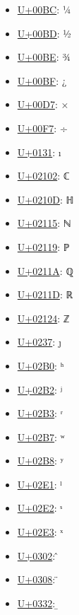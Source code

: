 \begin{itemize}
	\item \href{https://decodeunicode.org/en/u+00BC}{U+00BC}: ¼
	\item \href{https://decodeunicode.org/en/u+00BD}{U+00BD}: ½
	\item \href{https://decodeunicode.org/en/u+00BE}{U+00BE}: ¾
	\item \href{https://decodeunicode.org/en/u+00BF}{U+00BF}: ¿
	\item \href{https://decodeunicode.org/en/u+00D7}{U+00D7}: ×
	\item \href{https://decodeunicode.org/en/u+00F7}{U+00F7}: ÷
	\item \href{https://decodeunicode.org/en/u+0131}{U+0131}: ı
	\item \href{https://decodeunicode.org/en/u+02102}{U+02102}: ℂ
	\item \href{https://decodeunicode.org/en/u+0210D}{U+0210D}: ℍ
	\item \href{https://decodeunicode.org/en/u+02115}{U+02115}: ℕ
	\item \href{https://decodeunicode.org/en/u+02119}{U+02119}: ℙ
	\item \href{https://decodeunicode.org/en/u+0211A}{U+0211A}: ℚ
	\item \href{https://decodeunicode.org/en/u+0211D}{U+0211D}: ℝ
	\item \href{https://decodeunicode.org/en/u+02124}{U+02124}: ℤ
	\item \href{https://decodeunicode.org/en/u+0237}{U+0237}: ȷ
	\item \href{https://decodeunicode.org/en/u+02B0}{U+02B0}: ʰ
	\item \href{https://decodeunicode.org/en/u+02B2}{U+02B2}: ʲ
	\item \href{https://decodeunicode.org/en/u+02B3}{U+02B3}: ʳ
	\item \href{https://decodeunicode.org/en/u+02B7}{U+02B7}: ʷ
	\item \href{https://decodeunicode.org/en/u+02B8}{U+02B8}: ʸ
	\item \href{https://decodeunicode.org/en/u+02E1}{U+02E1}: ˡ
	\item \href{https://decodeunicode.org/en/u+02E2}{U+02E2}: ˢ
	\item \href{https://decodeunicode.org/en/u+02E3}{U+02E3}: ˣ
	\item \href{https://decodeunicode.org/en/u+0302}{U+0302}: ̂
	\item \href{https://decodeunicode.org/en/u+0308}{U+0308}: ̈
	\item \href{https://decodeunicode.org/en/u+0332}{U+0332}: ̲

\end{itemize}
